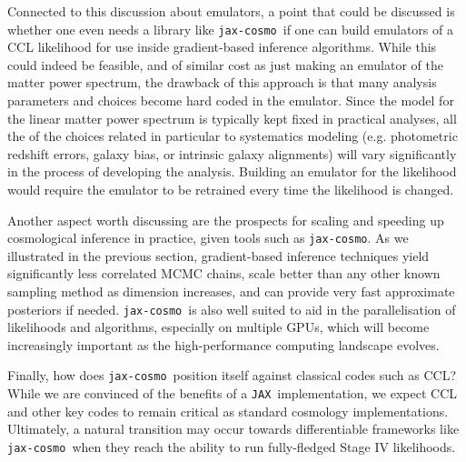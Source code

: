 \documentclass[twocolumn,twocolappendix,nofootinbib,iop]{openjournal}
\newcommand{\jaxcosmo}{\texttt{jax-cosmo}}
\newcommand{\jax}{\texttt{JAX}}
\begin{document}
Connected to this discussion about emulators, a point that could be discussed is whether one even needs a library like \jaxcosmo\ if one can build emulators of a CCL likelihood for use inside gradient-based inference algorithms. While this could indeed be feasible, and of similar cost as just making an emulator of the matter power spectrum, the drawback of this approach is that many analysis parameters and choices become hard coded in the emulator. Since the model for the linear matter power spectrum is typically kept fixed in practical analyses, all the of the choices related in particular to systematics modeling (e.g. photometric redshift errors, galaxy bias, or intrinsic galaxy alignments) will vary significantly in the process of developing the analysis. Building an emulator for the likelihood would require the emulator to be retrained every time the likelihood is changed.

\bigskip


Another aspect worth discussing are the prospects for scaling and speeding up cosmological inference in practice, given tools such as \jaxcosmo. As we illustrated in the previous section, gradient-based inference techniques yield significantly less correlated MCMC chains, scale better than any other known sampling method as dimension increases, and can provide very fast approximate posteriors if needed. \jaxcosmo\  is also well suited to aid in the parallelisation of likelihoods and algorithms, especially on multiple GPUs, which will become increasingly important as the high-performance computing landscape evolves.



\bigskip

Finally, how does \jaxcosmo\ position itself against classical codes such as CCL?  While we are convinced of the benefits of a \jax\ implementation, we expect CCL and other key codes to remain critical as standard cosmology implementations.  Ultimately, a natural transition may occur towards differentiable frameworks like \jaxcosmo\ when they reach the ability to run fully-fledged Stage IV likelihoods.
\end{document}
